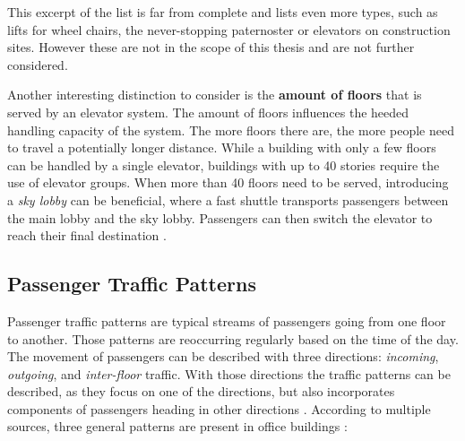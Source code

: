 This excerpt of the list is far from complete and \textcite[][pp.~141--158]{unger2015aufzuege} lists even more types, 
such as lifts for wheel chairs, the never-stopping paternoster or elevators on construction sites.
However these are not in the scope of this thesis and are not further considered.

Another interesting distinction to consider is the \textbf{amount of floors} that is served by an elevator system.
The amount of floors influences the heeded handling capacity of the system.
The more floors there are, the more people need to travel a potentially longer distance.
While a building with only a few floors can be handled by a single elevator,
buildings with up to 40 stories require the use of elevator groups.
When more than 40 floors need to be served, 
introducing a \emph{sky lobby} can be beneficial, 
where a fast shuttle transports passengers between the main lobby and the sky lobby. Passengers can then switch the elevator to reach their final destination \autocite[][p.~9]{hakonen2003simulation}.

%



\subsection{Passenger Traffic Patterns}
Passenger traffic patterns are typical streams of passengers going from one floor to another.
Those patterns are reoccurring regularly based on the time of the day.
The movement of passengers can be described with three directions: \emph{incoming}, \emph{outgoing}, and \emph{inter-floor} traffic.
With those directions the traffic patterns can be described, as they focus on one of the directions, but also incorporates components of passengers heading in other directions \autocite[][p.~259]{siikonen1993simulation}.
According to multiple sources, three general patterns are present in office buildings \autocite[][pp.~1--2]{beers2015arrivals}
\autocite[][pp.~6--7]{axelsson2013strategies}
\autocite[][p.~194]{unger2015aufzuege}
\autocite[][p.~14]{siikonen1997models}:

